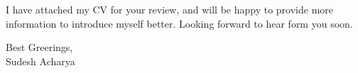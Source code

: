 \documentclass[11pt,A4]{article}
\newcommand{\mystrut}{\rule[-.3\baselineskip]{0pt}{\baselineskip}}
\begin{document}
\vspace{30pt}
I have attached my CV for your review, and will be happy to provide more information to introduce myself better. Looking forward to hear form you soon.

\vspace{25pt}
\begin{flushleft}
{Best Greerings,}\\
\vspace{7pt}
{Sudesh Acharya}\\


\end{flushleft}



\null
\vspace*{\fill}
\hspace{-0.25\linewidth}\colorbox{bgcol}{\makebox[1.5\linewidth][c]{\mystrut \small \textcolor{white}{***}}}


%
%
\end{document}
